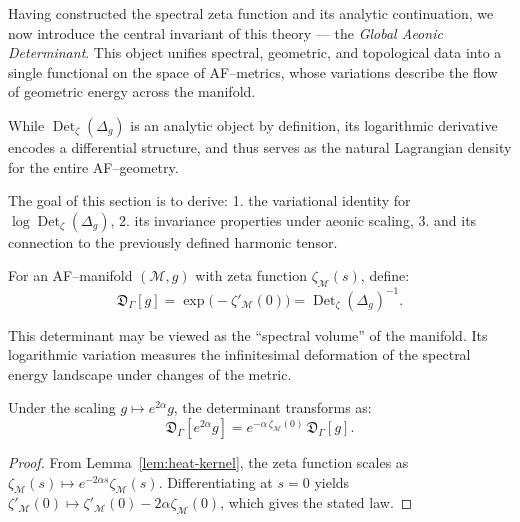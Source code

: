 Having constructed the spectral zeta function and its analytic continuation,
we now introduce the central invariant of this theory —
the \emph{Global Aeonic Determinant}.
This object unifies spectral, geometric, and topological data into
a single functional on the space of AF–metrics,
whose variations describe the flow of geometric energy across the manifold.

While \(\operatorname{Det}_\zeta(\Delta_g)\)
is an analytic object by definition, its logarithmic derivative
encodes a differential structure,
and thus serves as the natural Lagrangian density
for the entire AF–geometry.

The goal of this section is to derive:
1. the variational identity for \(\log\operatorname{Det}_\zeta(\Delta_g)\),
2. its invariance properties under aeonic scaling,
3. and its connection to the previously defined harmonic tensor.


\begin{definition}
\label{def:aeonic-det}
For an AF–manifold \((\mathcal{M},g)\)
with zeta function \(\zeta_{\mathcal{M}}(s)\),
define:
\begin{equation}
\label{eq:aeonic-det}
\mathfrak{D}_\Gamma[g]
=
\exp\!\Big(
-\zeta'_{\mathcal{M}}(0)
\Big)
=
\operatorname{Det}_\zeta(\Delta_g)^{-1}.
\end{equation}
\end{definition}

\begin{remark}
This determinant may be viewed as the “spectral volume” of the manifold.
Its logarithmic variation measures the infinitesimal deformation
of the spectral energy landscape under changes of the metric.
\end{remark}

\begin{lemma}
\label{lem:aeonic-scale-det}
Under the scaling \(g \mapsto e^{2\alpha}g\),
the determinant transforms as:
\begin{equation}
\label{eq:det-scaling}
\mathfrak{D}_\Gamma[e^{2\alpha}g]
=
e^{-\alpha\,\zeta_{\mathcal{M}}(0)}\,\mathfrak{D}_\Gamma[g].
\end{equation}
\end{lemma}

\begin{proof}
From Lemma~\ref{lem:heat-kernel},
the zeta function scales as
\(\zeta_{\mathcal{M}}(s) \mapsto e^{-2\alpha s}\zeta_{\mathcal{M}}(s)\).
Differentiating at \(s=0\) yields
\(\zeta'_{\mathcal{M}}(0) \mapsto \zeta'_{\mathcal{M}}(0) - 2\alpha\zeta_{\mathcal{M}}(0)\),
which gives the stated law.
\end{proof}

